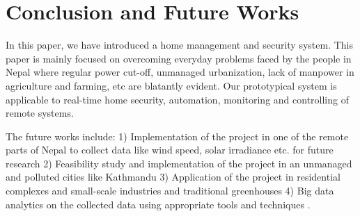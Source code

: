\documentclass[journal,twoside]{IEEEtran}
\begin{document}
%





\section{Conclusion and Future Works}

In this paper, we have introduced a home management
and security system. This paper is mainly focused on 
overcoming everyday problems faced by the people in
Nepal where regular power cut-off, unmanaged
urbanization, lack of manpower in agriculture and
farming, etc are blatantly evident. Our prototypical system
is applicable to real-time home security, automation,
monitoring and controlling of remote systems.

The future works include: 1) Implementation of the project
in one of the remote parts of Nepal to collect data like wind
speed, solar irradiance etc. for future research 2) Feasibility
study and implementation of the project in an unmanaged and
polluted cities like Kathmandu 3) Application of the project in
residential complexes and small-scale industries \cite{Pavithra2015} \cite{Zuehlke2010} and
traditional greenhouses\cite{Dan2015}  4) Big data analytics on the collected
data using appropriate tools and techniques \cite{Signorini2016}.
\end{document}
